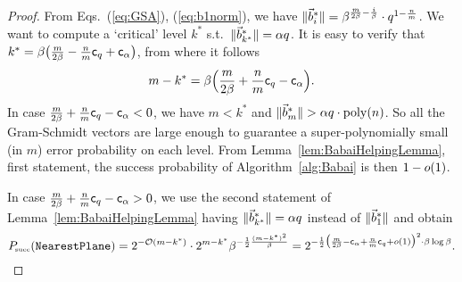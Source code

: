 \begin{proof}
	From Eqs.~(\ref{eq:GSA}), (\ref{eq:b1norm}), we have $\| \vec b^*_i \| = \beta^{\frac{m}{2 \beta} - \frac{i}{\beta}} \cdot q^{1 - \frac{n}{m}}$. We want to compute a `critical' level $k^*$ s.t.\ $\| \vec b^*_{k^*} \| = \alpha q$. It is easy to verify that $k^* = \beta \bigl( \frac{m}{2 \beta} - \frac{n}{m} \mathsf{c}_q + \mathsf{c}_{\alpha} \bigr)$, from where it follows
	\begin{equation} \label{eq:BabaiProof}
		m - k^* = \beta \Bigl( \frac{m}{2 \beta} + \frac{n}{m} \mathsf{c}_q - \mathsf{c}_{\alpha} \Bigr).
	\end{equation}
In case $\frac{m}{2 \beta} + \frac{n}{m} \mathsf{c}_q - \mathsf{c}_{\alpha} < 0$, we have $m < k^*$ and $\| \vec b^*_m \| > \alpha q \cdot \mathrm{poly}(n)$. So all the Gram-Schmidt vectors are large enough to guarantee a super-polynomially small (in $m$) error probability on each level. From Lemma~\ref{lem:BabaiHelpingLemma}, first statement, the success probability of Algorithm~\ref{alg:Babai} is then $1-o(1)$.

In case $\frac{m}{2 \beta} + \frac{n}{m} \mathsf{c}_q - \mathsf{c}_{\alpha} > 0$, we use the second statement of Lemma~\ref{lem:BabaiHelpingLemma} having $\| \vec b^*_{k^*} \| = \alpha q$ instead of $\| \vec b^*_1\|$ and obtain
	\[
		P\mkern-4mu_{\mbox{\tiny succ}}(\texttt{NearestPlane}) = 2^{-\mathcal{O}(m-k^*)} \cdot 2^{m-k^*} \beta^{-\frac{1}{2} \frac{(m-k^*)^2}{\beta}} = 2^{-\frac{1}{2} \bigl(\frac{m}{2\beta}-\mathsf{c}_{\alpha} + \frac{n}{m} \mathsf{c}_q  + o(1) \bigr) ^2 \cdot \beta \log\beta}.
	\]
\end{proof}
